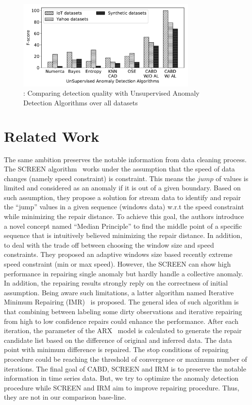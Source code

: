 \begin{figure}[h]
	\centering
	\includegraphics[width=0.8\textwidth]{Part3/Chapter7/figures/SVs_compare_unsuperviced_yahoo.pdf}
	\caption{ : Comparing detection quality with Unsupervised Anomaly Detection Algorithms over all datasets}
	\label{fig:comapration_USVs_sync}
\end{figure}

\section{Related Work}
The same ambition preserves the notable information from data cleaning process. The SCREEN algorithm~\cite{song2015screen}
works under the assumption that the speed of data changes (namely speed constraint) is constraint. This means the $jump$ of values is limited and considered as an anomaly if it is out of a given boundary. Based on such assumption, they propose a solution for stream data to identify and repair the  “jump” values in a given sequence (windows data) w.r.t the speed constraint while minimizing the repair distance. To achieve this goal, the authors introduce a novel concept named “Median Principle” to find the middle point of a specific sequence that is intuitively believed minimizing the repair distance. In addition, to deal with the trade off between choosing the window size and speed constraints. They proposed an adaptive windows size based recently extreme speed constraint (min or max speed). However, the SCREEN can show high performance in repairing single anomaly but hardly handle a collective anomaly. In addition, the repairing results strongly reply on the correctness of initial assumption. Being aware such limitations, a latter algorithm named Iterative Minimum Repairing (IMR)~\cite{zhang2017time} is proposed. The general idea of such algorithm is that combining between labeling some dirty observations and iterative repairing from high to low confidence repairs could enhance the performance. After each iteration, the parameter of the ARX~\cite{park2005outlier} model is calculated to generate the repair candidate list based on the difference of original and inferred data. The data point with minimum difference is repaired. The stop conditions of repairing procedure could be reaching the threshold of convergence or maximum number of iterations. The final goal of CABD, SCREEN and IRM is to preserve the notable information in time series data. But, we try to optimize the anomaly detection procedure while SCREEN and IRM aim to improve repairing procedure. Thus, they are not in our comparison base-line.  \\

